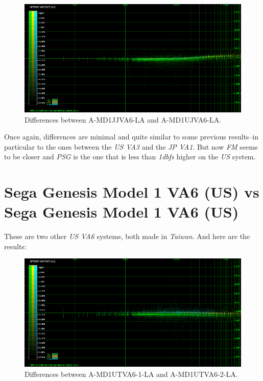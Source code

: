 \documentclass[10pt,a4paper]{report}
\newcommand{\db}[1]{\textit{\mbox{#1\acrshort{dbfs}}}}
\begin{document}
\begin{figure}[H]
	\centering
	\includegraphics[width=1.0\linewidth]{images/results/3-A-MD1JJVA6-LA_vs_A-MD1UJVA6-LA.png}
	\caption[A-MD1JJVA6-LA vs A-MD1UJVA6-LA]{Differences between A-MD1JJVA6-LA and A-MD1UJVA6-LA.}
	\label{fig:A-MD1JJVA6-LA_vs_A-MD1UJVA6-LA}
\end{figure}

Once again, differences are minimal and quite similar to some previous results--in particular to the ones between the \textit{US VA3} and the \textit{JP VA1}. But now \textit{FM} seems to be closer and \textit{PSG} is the one that is less than \db{1} higher on the \textit{US} system.

\section{Sega Genesis Model 1 VA6 (US) vs\\ Sega Genesis Model 1 VA6 (US)}

These are two other \textit{US VA6} systems, both made in \textit{Taiwan}. And here are the results:

\begin{figure}[H]
	\centering
	\includegraphics[width=1.0\linewidth]{images/results/4-A-MD1UTVA6-1-LA_vs_A-MD1UTVA6-2-LA.png}
	\caption[A-MD1UTVA6-1-LA vs A-MD1UTVA6-2-LA]{Differences between A-MD1UTVA6-1-LA and A-MD1UTVA6-2-LA.}
	\label{fig:A-MD1UTVA6-1-LA_vs_A-MD1UTVA6-2-LA}
\end{figure}
\end{document}
